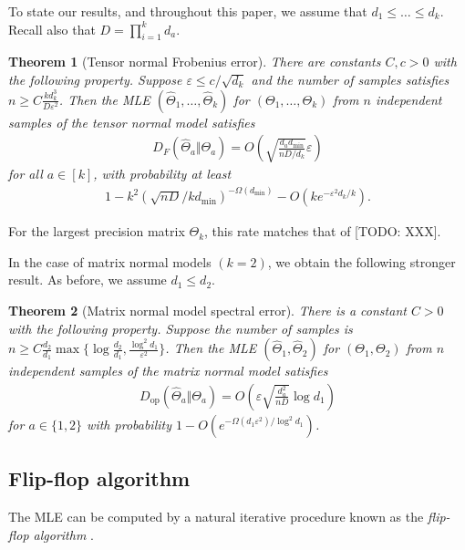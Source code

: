 \documentclass[aos]{imsart}
\newtheorem{theorem}{Theorem}[section]
\theoremstyle{definition}
\numberwithin{equation}{section}
\DeclareMathOperator{\op}{op}
\newcommand{\eps}{\varepsilon}
\newcommand{\CF}[1]{{\color{purple}[CF: #1]}}
\newcommand{\TODO}[1]{{\color{blue}[TODO: #1]}}
\begin{document}
To state our results, and throughout this paper, we assume that $d_1 \leq \dots \leq d_k$.
Recall also that $D = \prod_{i=1}^k d_a$.

\begin{theorem}[Tensor normal Frobenius error]\label{thm:tensor-frobenius}
There are constants $C,c>0$ with the following property.
Suppose $\eps \leq c/\sqrt{d_k}$ and the number of samples satisfies $n \geq C \frac{k d_k^3}{D\eps^2}$.
Then the MLE $(\widehat{\Theta}_1, \dots, \widehat{\Theta}_k) $ for $(\Theta_1, \dots, \Theta_k)$ from $n$ independent samples of the tensor normal model satisfies
\begin{align*}
  D_F(\widehat{\Theta}_a \Vert \Theta_a) = O\left( \sqrt{\frac{d_a d_{\min}}{n D/d_k}}\eps\right)
\end{align*}
for all $a \in [k]$, with probability at least
\begin{align*}
  1 - k^2 \left(\sqrt{nD} / kd_{\min} \right)^{ - \Omega(d_{\min})} - O(k e^{ - \eps^2 d_k / k}).
\end{align*}
\end{theorem}

\noindent
For the largest precision matrix $\Theta_k$, this rate matches that of \TODO{XXX}.

In the case of matrix normal models $(k=2)$, we obtain the following stronger result.
As before, we assume $d_1 \leq d_2$.

\begin{theorem}[Matrix normal model spectral error]\label{thm:matrix-normal}
There is a constant $C>0$ with the following property.
Suppose the number of samples is $n \geq C \frac{d_2}{d_1} \max \{\log \frac{d_2}{d_1},  \frac{\log^2 d_1}{\eps^2}\}$.
Then the MLE $(\widehat{\Theta}_1,\widehat{\Theta}_2) $ for $(\Theta_1, \Theta_2)$ from $n$ independent samples of the matrix normal model satisfies
\begin{align*}
  D_{\op}(\widehat{\Theta}_a \Vert \Theta_a) = O\left(\eps \sqrt{\frac{d_a^2}{nD}} \log d_1\right)
\end{align*}
for $a \in \{1,2\}$ with probability $1 - O(e^{ - \Omega( d_1 \eps^2)/\log^2 d_1})$.
\end{theorem}

\subsection{Flip-flop algorithm}
The MLE can be computed by a natural iterative procedure known as the \emph{flip-flop algorithm} \citep{dutilleul1999mle,gurvits2004classical}.
\end{document}
